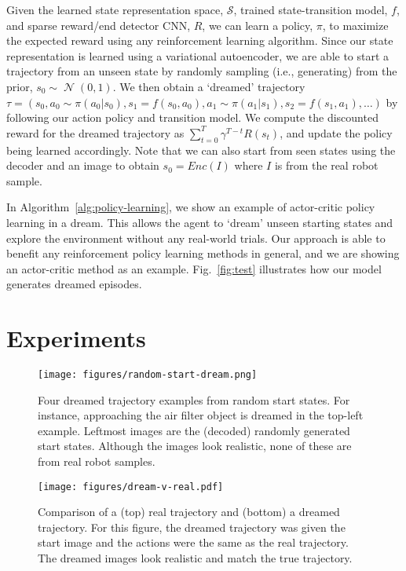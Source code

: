 \documentclass[letterpaper, 10 pt, conference]{ieeeconf}
\DeclareMathOperator{\N}{\mathcal{N}}
\begin{document}
Given the learned state representation space, $\mathcal{S}$, trained state-transition model, $f$, and sparse reward/end detector CNN, $R$, we can learn a policy, $\pi$, to maximize the expected reward using any reinforcement learning algorithm.
Since our state representation is learned using a variational autoencoder, we are able to start a trajectory from an unseen state by randomly sampling (i.e., generating) from the prior, $s_0\sim\N(0,1)$.
We then obtain a `dreamed' trajectory $\tau = (s_0, a_0\sim\pi(a_0|s_0), s_1=f(s_0, a_0), a_1\sim\pi(a_1|s_1), s_2=f(s_1, a_1), \ldots)$ by following our action policy and transition model. 
We compute the discounted reward for the dreamed trajectory as $\sum_{t=0}^T \gamma^{T-t} R(s_t)$, and update the policy being learned accordingly. Note that we can also start from seen states using the decoder and an image to obtain $s_0=Enc(I)$ where $I$ is from the real robot sample.

In Algorithm~\ref{alg:policy-learning}, we show an example of actor-critic policy learning in a dream.
This allows the agent to `dream' unseen starting states and explore the environment without any real-world trials. Our approach is able to benefit any reinforcement policy learning methods in general, and we are showing an actor-critic method as an example. Fig.~\ref{fig:test} illustrates how our model generates dreamed episodes.


\section{Experiments}
\label{sec:exp}
\begin{figure}
    \centering
      \texttt{[image: figures/random-start-dream.png]}
      \caption{Four dreamed trajectory examples from random start states. For instance, approaching the air filter object is dreamed in the top-left example. Leftmost images are the (decoded) randomly generated start states. Although the images look realistic, none of these are from real robot samples.
}
      \label{fig:rand-dream}
\end{figure}


\begin{figure}
    \centering
      \texttt{[image: figures/dream-v-real.pdf]}
      \caption{Comparison of a (top) real trajectory and (bottom) a dreamed trajectory. For this figure, the dreamed trajectory was given the start image and the actions were the same as the real trajectory. The dreamed images look realistic and match the true trajectory.}
      \label{fig:real-v-dream}
\end{figure}
\end{document}
